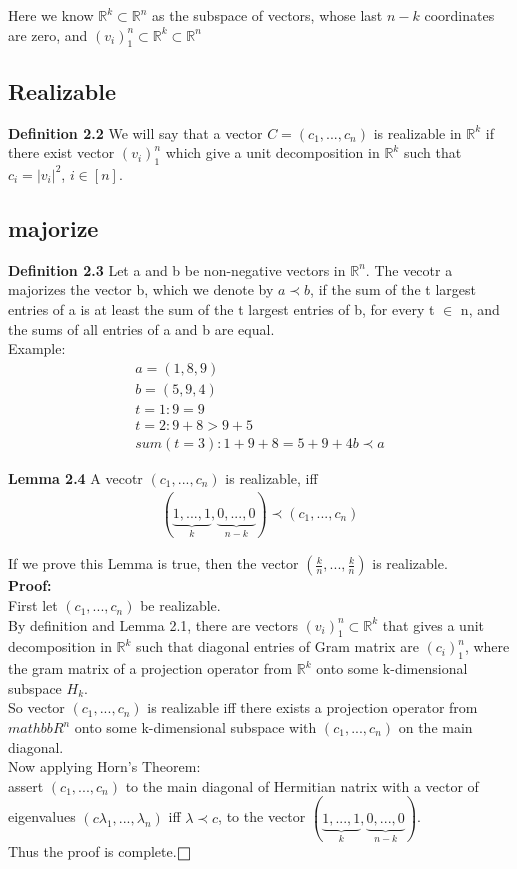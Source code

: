 \documentclass[fontsize=12pt,a4paper]{article}
\def\msquare{\mathord{\scalerel*{\Box}{gX}}}
\begin{document}
Here we know $\mathbb{R}^k \subset \mathbb{R}^n$ as the subspace of vectors, whose last $n-k$ coordinates are zero, and $(v_i)^n_1 \subset \mathbb{R}^k \subset \mathbb{R}^n $\\

\subsection{Realizable}
\textbf{Definition 2.2} We will say that a vector $C=(c_1,...,c_n)$ is realizable in $\mathbb{R}^k$ if there exist vector $(v_i)^n_1$ which give a unit decomposition in $\mathbb{R}^k$ such that $c_i = |v_i|^2$, $i \in [n]$.

\subsection{majorize}
\textbf{Definition 2.3} Let a and b be non-negative vectors in $\mathbb{R}^n$. The vecotr a majorizes the vector b, which we denote by $a \prec b$, if the sum of the t largest entries of a is at least the sum of the t largest entries of b, for every t $\in$ n, and the sums of all entries of a and b are equal.\\
Example: \\
\begin{align*}
     a = (1,8,9)\\
    b = (5,9,4)\\
    t = 1: 9 = 9\\
    t = 2: 9+8 > 9+5\\
    sum (t=3): 1+9+8 = 5+9+4
    b \prec a
\end{align*}


\textbf{Lemma 2.4} A vecotr $(c_1,...,c_n)$ is realizable, iff
\begin{align}
    (\underbrace{1,...,1}_{k},\underbrace{0,...,0}_{n-k}) \prec (c_1,...,c_n)
\end{align}

If we prove this Lemma is true, then the vector $(\frac{k}{n},...,\frac{k}{n})$ is realizable.\\

\textbf{Proof:}\\
First let $(c_1,...,c_n)$ be realizable.\\
By definition and Lemma 2.1, there are vectors $(v_i)^n_1 \subset \mathbb{R}^k$ that gives a unit decomposition in $\mathbb{R}^k$ such that diagonal entries of Gram matrix are $(c_i)^n_1$, where the gram matrix of a projection operator from $
\mathbb{R}^k$ onto some k-dimensional subspace $H_k$.\\
So vector $(c_1,...,c_n)$ is realizable iff there exists a projection operator from $mathbb{R}^n$ onto some k-dimensional subspace with $(c_1,...,c_n)$ on the main diagonal.\\
Now applying Horn's Theorem:\\
assert $(c_1,...,c_n)$ to the main diagonal of Hermitian natrix with a vector of eigenvalues $(c\lambda_1,...,\lambda_n)$ iff $\lambda \prec c$, to the vector $(\underbrace{1,...,1}_{k},\underbrace{0,...,0}_{n-k})$.\\
Thus the proof is complete.$\msquare{}$\\
\end{document}
